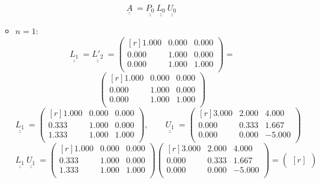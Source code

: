 \documentclass{report}[10pts]
\begin{document}
\begin{enumerate}[- Ex. 1]
\begin{itemize}
\[\]
\[
   \underline{\underline{A}}~
   =
   \underline{\underline{P_{0}}}~
   \underline{\underline{L_{0}}}~
   \underline{\underline{U_{0}}}~
\]
\item $n=1$:
\[
   \underline{\underline{L_{1}}}~
   =
   \underline{\underline{L'_{2}}}~
   =
      \begin{pmatrix}[r]
         1.000 & 0.000 & 0.000\\
         0.000 & 1.000 & 0.000\\
         0.000 & 1.000 & 1.000\\
      \end{pmatrix}
   =
\]
\[
      \begin{pmatrix*}[r]
         1.000 & 0.000 & 0.000\\
         0.000 & 1.000 & 0.000\\
         0.000 & 1.000 & 1.000\\
      \end{pmatrix*}
\]
\[
   \underline{\underline{L_{1}}}~
   =
      \begin{pmatrix*}[r]
         1.000 & 0.000 & 0.000\\
         0.333 & 1.000 & 0.000\\
         1.333 & 1.000 & 1.000\\
      \end{pmatrix*}
   ,\qquad
   \underline{\underline{U_{1}}}~
   =
      \begin{pmatrix*}[r]
         3.000 & 2.000 & 4.000\\
         0.000 & 0.333 & 1.667\\
         0.000 & 0.000 & -5.000\\
      \end{pmatrix*}
\]
\[
   \underline{\underline{L_{1}}}~
   \underline{\underline{U_{1}}}~
   =
      \begin{pmatrix*}[r]
         1.000 & 0.000 & 0.000\\
         0.333 & 1.000 & 0.000\\
         1.333 & 1.000 & 1.000\\
      \end{pmatrix*}
      \begin{pmatrix*}[r]
         3.000 & 2.000 & 4.000\\
         0.000 & 0.333 & 1.667\\
         0.000 & 0.000 & -5.000\\
      \end{pmatrix*}
   =
      \begin{pmatrix*}[r]

\end{pmatrix*}\]
\end{itemize}
\end{enumerate}
\end{document}
